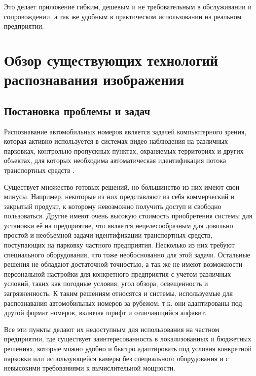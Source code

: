 \documentclass[a4paper,12pt]{article}
\begin{document}
Это делает приложение гибким, дешевым и не требовательным в обслуживании и сопровождении, а так же удобным в практическом использовании на реальном предприятии.  


\newpage
\section{Обзор существующих технологий распознавания изображения}

\subsection{Постановка проблемы и задач}

Распознавание автомобильных номеров является задачей компьютерного зрения, которая активно используется в системах видео-наблюдения на различных парковках, контрольно-пропускных пунктах, охраняемых территориях и других объектах,  для которых необходима автоматическая идентификация потока транспортных средств \cite{beliy}.

Существует множество готовых решений, но большинство из них имеют свои минусы.
Например, некоторые из них представляют из себя коммерческий и закрытый продукт, к которому невозможно получить доступ и свободно пользоваться.
Другие имеют очень высокую стоимость приобретения системы для установки её на предприятие, что является нецелесообразным для довольно простой и необъемной задачи идентификации транспортных средств, поступающих на парковку частного предприятия.
Несколько из них требуют специального оборудования, что тоже необоснованно для этой задачи.
Остальные решения не обладают достаточной точностью, а так же не имеют возможности персональной настройки для конкретного предприятия с учетом различных условий, таких как погодные условия, угол обзора, освещенность и загрязненность. К таким решениям относятся и системы, используемые для распознавания автомобильных номеров за рубежом, т.к. они адаптированы под другой формат номеров, включая шрифт и отличающийся алфавит.

Все эти пункты делают их недоступным для использования на частном предприятии, где существует заинтересованность в локализованных и бюджетных решениях, которые можно удобно и быстро адаптировать под условия конкретной парковки или использующейся камеры без специального оборудования и с невысокими требованиями к вычислительной мощности.
\end{document}
